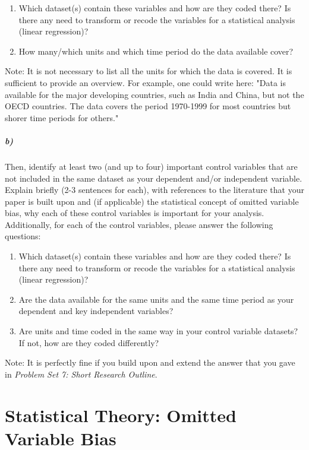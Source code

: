 \documentclass[12pt]{article}
\begin{document}
\begin{enumerate}
	\item Which dataset(s) contain these variables and how are they coded there? Is there any need to transform or recode the variables for a statistical analysis (linear regression)?
	\item How many/which units and which time period do the data available cover?
\end{enumerate}

Note: It is not necessary to list all the units for which the data is covered. It is sufficient to provide an overview. For example, one could write here: "Data is available for the major developing countries, such as India and China, but not the OECD countries. The data covers the period 1970-1999 for most countries but shorer time periods for others."

\subparagraph{b)} Then, identify at least two (and up to four) important control variables that are not included in the same dataset as your dependent and/or independent variable. Explain briefly (2-3 sentences for each), with references to the literature that your paper is built upon and (if applicable) the statistical concept of omitted variable bias, why each of these control variables is important for your analysis. Additionally, for each of the control variables, please answer the following questions:

\begin{enumerate}
	\item Which dataset(s) contain these variables and how are they coded there? Is there any need to transform or recode the variables for a statistical analysis (linear regression)?
	\item Are the data available for the same units and the same time period as your dependent and key independent variables?
	\item Are units and time coded in the same way in your control variable datasets? If not, how are they coded differently?
\end{enumerate}

Note: It is perfectly fine if you build upon and extend the answer that you gave in \textit{Problem Set 7: Short Research Outline}.



\section*{Statistical Theory: Omitted Variable Bias}
\end{document}
